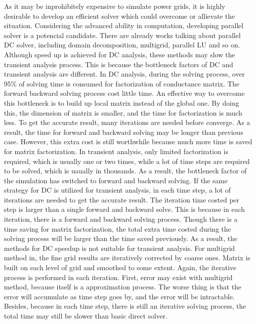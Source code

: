 \documentclass[conference]{IEEEtran}
\begin{document}
As it may be inprohibitely expensive to simulate power grids, it is highly desirable to develop an efficient solver which could overcome or
allievate the situation. Considering the advanced ability in computation, developing parallel solver is a potencial candidate. There are 
already
works talking about parallel DC solver, including domain decomposition\cite{PETSC_website, kaisun, voronov}, multigrid\cite{Zhuofeng,Kozhaya}, parallel LU\cite{Super_LU_website} %
and so on. Although speed up 
is achieved for DC analysis, these methods may slow the transient analysis process. This is because the bottleneck factors of DC and 
transient analysis are different. In DC analysis, during the solving process, over 95\% of solving time is consumed for factorization of 
conductance 
matrix. The forward backward solving process cost little time. An effective way to overcome this bottleneck is to build up local matrix
instead of the global one. By doing this, the dimension of matrix is smaller, and the time for factorization is much less. To get the 
accurate result, many iterations are needed before converge. As a result, the time for forward and backward solving may be longer than 
previous case. However, this extra cost is still worthwhile because much more time is saved for matrix factorization. In transient 
analysis, only limited factorization is required, which is usually one or two times, while a lot of time steps are required to be solved, 
which is uaually in thousands. As a result, the bottleneck factor of the simulation has switched to forward and backward solving. If the same strategy for DC is utilized for transient analysis, in each time step, a lot of iterations are needed to get the accurate result. The 
iteration time costed per step is larger than a single forward and backward solve. This is because in each iteration, there is a forward 
and backward solving process. Though there is a time saving for matrix factorization, the total extra time costed during the solving 
process will be larger than the time saved previously. As a result, the methods for DC speedup is not suitable for transient analysis.
For multigrid method in\cite{Zhuofeng,Kozhaya}, the fine grid results are iteratively corrected by coarse ones. Matrix is built on each level of grid and 
smoothed to some extent. Again, the iterative process is performed in each iteration. First, error may exist with multigrid method, 
because itself is a approximation process. The worse thing is that the error will accumulate as time step goes by, and the error will be 
intractable. Besides, because in each time step, there is still an iterative solving process, the total time may still be slower than 
basic direct solver.
\end{document}
